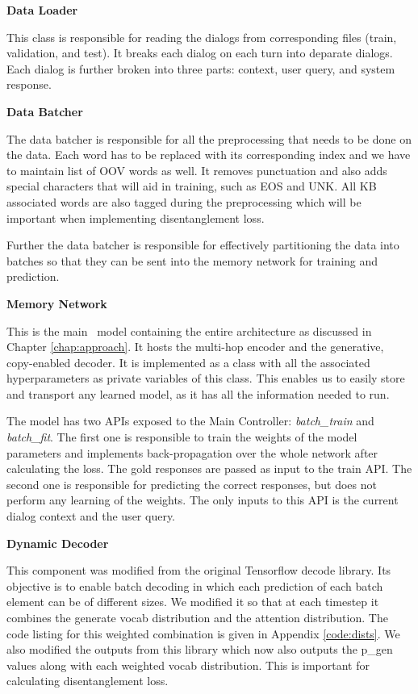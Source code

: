 \noindent\textbf{Data Loader}

This class is responsible for reading the dialogs from corresponding files (train, validation, and test). It breaks each dialog on each turn into deparate dialogs. Each dialog is further broken into three parts: context, user query, and system response.

\noindent\textbf{Data Batcher} 

The data batcher is responsible for all the preprocessing that needs to be done on the data. Each word has to be replaced with its corresponding index and we have to maintain list of OOV words as well. It removes punctuation and also adds special characters that will aid in training, such as EOS and UNK. All KB associated words are also tagged during the preprocessing which will be important when implementing disentanglement loss.

Further the data batcher is responsible for effectively partitioning the data into batches so that they can be sent into the memory network for training and prediction.

\noindent\textbf{Memory Network}

This is the main \sys\ model containing the entire architecture as discussed in Chapter \ref{chap:approach}. It hosts the multi-hop encoder and the generative, copy-enabled decoder. It is implemented as a class with all the associated hyperparameters as private variables of this class. This enables us to easily store and transport any learned model, as it has all the information needed to run.

The model has two APIs exposed to the Main Controller: \emph{batch\_train} and \emph{batch\_fit}. The first one is responsible to train the weights of the model parameters and implements back-propagation over the whole network after calculating the loss. The gold responses are passed as input to the train API. The second one is responsible for predicting the correct responses, but does not perform any learning of the weights. The only inputs to this API is the current dialog context and the user query.

\noindent\textbf{Dynamic Decoder}

This component was modified from the original Tensorflow decode library. Its objective is to enable batch decoding in which each prediction of each batch element can be of different sizes. We modified it so that at each timestep it combines the generate vocab distribution and the attention distribution. The code listing for this weighted combination is given in Appendix \ref{code:dists}. We also modified the outputs from this library which now also outputs the p\_gen values along with each weighted vocab distribution. This is important for calculating disentanglement loss.

